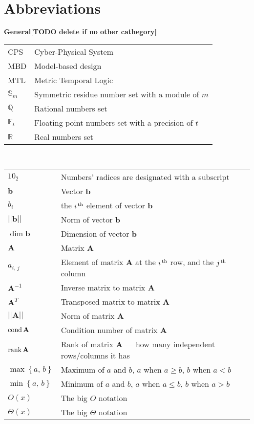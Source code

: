 \chapter*{Abbreviations}

{\bf General[TODO delete if no other cathegory]}\\

\begin{tabular}{ll}
CPS & Cyber-Physical System\\
MBD & Model-based design\\
MTL & Metric Temporal Logic\\
{$\mathbb S_m$} & Symmetric residue number set with a module of $m$\\
{$\mathbb Q$} & Rational numbers set\\
{$\mathbb F_t$} & Floating point numbers set with a precision of $t$\\
{$\mathbb R$} & Real numbers set
\end{tabular}
\vskip 1cm

\\

\begin{tabular}{ll}
$10_2$ & Numbers' radices are designated with a subscript \\
${\mathbf b}$ & Vector $\mathbf b$\\
$b_{i}$ & the $i^{\,{\rm th}}$ element of vector $\mathbf b$\\
${||\mathbf b||}$ & Norm of vector $\mathbf b$\\
$\dim \mathbf b$ & Dimension of vector $\mathbf b$\\
${\mathbf A}$ & Matrix $\mathbf A$\\
$a_{i,\,j}$ & Element of matrix $\mathbf A$ at the $i^{\,{\rm th}}$ row, and the $j^{\,{\rm th}}$ column\\
${\mathbf A^{-1}}$ & Inverse matrix to matrix $\mathbf A$\\
${\mathbf A^T}$ & Transposed matrix to matrix $\mathbf A$\\
${||\mathbf A||}$ & Norm of matrix $\mathbf A$\\
$\mathop{\mathrm{cond}}\nolimits \mathbf A$ & Condition number of matrix $\mathbf A$\\
$\mathop{\mathrm{rank}}\nolimits \mathbf A$ & Rank of matrix $\mathbf A$ --- how many independent rows/columns it has\\
$\max\left\{a,\,b\right\}$ & Maximum of $a$ and $b$, $a$ when $a\geq b$, $b$ when $a<b$\\
$\min\left\{a,\,b\right\}$ & Minimum of $a$ and $b$, $a$ when $a\leq b$, $b$ when $a>b$\\
$O(x)$ & The big $O$ notation\\
$\Theta(x)$ & The big $\Theta$ notation\\
\end{tabular}
\newpage

